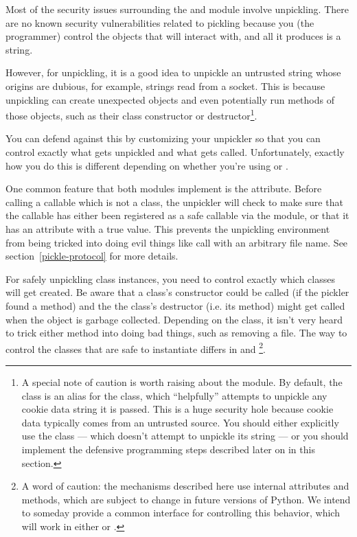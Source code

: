 Most of the security issues surrounding the  and
 module involve unpickling.  There are no known
security vulnerabilities
related to pickling because you (the programmer) control the objects
that  will interact with, and all it produces is a
string.

However, for unpickling, it is  a good idea to unpickle
an untrusted string whose origins are dubious, for example, strings
read from a socket.  This is because unpickling can create unexpected
objects and even potentially run methods of those objects, such as
their class constructor or destructor\footnote{A special note of
caution is worth raising about the 
module.  By default, the  class is an alias for
the  class, which ``helpfully'' attempts to
unpickle any cookie data string it is passed.  This is a huge security
hole because cookie data typically comes from an untrusted source.
You should either explicitly use the  class
--- which doesn't attempt to unpickle its string --- or you should
implement the defensive programming steps described later on in this
section.}.

You can defend against this by customizing your unpickler so that you
can control exactly what gets unpickled and what gets called.
Unfortunately, exactly how you do this is different depending on
whether you're using  or .

One common feature that both modules implement is the
 attribute.  Before calling a callable
which is not a class, the unpickler will check to make sure that the
callable has either been registered as a safe callable via the
 module, or that it has an
attribute  with a true value.  This
prevents the unpickling environment from being tricked into doing
evil things like call  with an arbitrary file name.
See section~\ref{pickle-protocol} for more details.

For safely unpickling class instances, you need to control exactly
which classes will get created.  Be aware that a class's constructor
could be called (if the pickler found a 
method) and the the class's destructor (i.e. its  method)
might get called when the object is garbage collected.  Depending on
the class, it isn't very heard to trick either method into doing bad
things, such as removing a file.  The way to
control the classes that are safe to instantiate differs in
 and \footnote{A word of caution: the
mechanisms described here use internal attributes and methods, which
are subject to change in future versions of Python.  We intend to
someday provide a common interface for controlling this behavior,
which will work in either  or .}.

